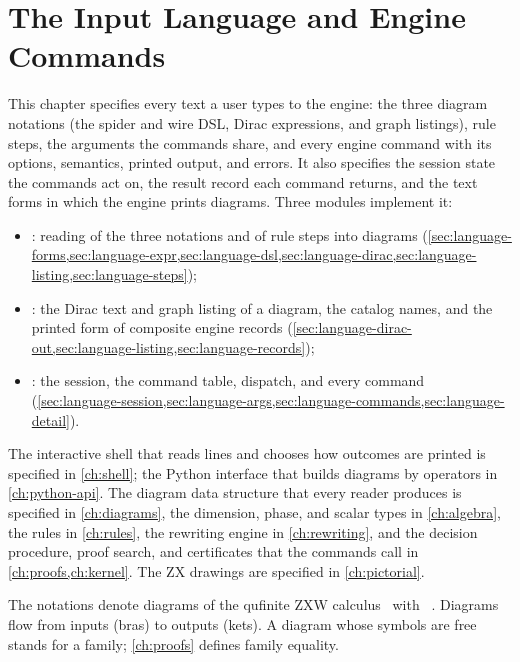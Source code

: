 \chapter{The Input Language and Engine Commands}\label{ch:language}

This chapter specifies every text a user types to the engine: the three diagram notations (the spider and wire DSL, Dirac expressions, and graph listings), rule steps, the arguments the commands share, and every engine command with its options, semantics, printed output, and errors. It also specifies the session state the commands act on, the result record each command returns, and the text forms in which the engine prints diagrams. Three modules implement it:
\begin{itemize}
\item {}: reading of the three notations and of rule steps into diagrams (\cref{sec:language-forms,sec:language-expr,sec:language-dsl,sec:language-dirac,sec:language-listing,sec:language-steps});
\item {}: the Dirac text and graph listing of a diagram, the catalog names, and the printed form of composite engine records (\cref{sec:language-dirac-out,sec:language-listing,sec:language-records});
\item {}: the session, the command table, dispatch, and every command (\cref{sec:language-session,sec:language-args,sec:language-commands,sec:language-detail}).
\end{itemize}
The interactive shell that reads lines and chooses how outcomes are printed is specified in \cref{ch:shell}; the Python interface that builds diagrams by operators in \cref{ch:python-api}. The diagram data structure that every reader produces is specified in \cref{ch:diagrams}, the dimension, phase, and scalar types in \cref{ch:algebra}, the rules in \cref{ch:rules}, the rewriting engine in \cref{ch:rewriting}, and the decision procedure, proof search, and certificates that the commands call in \cref{ch:proofs,ch:kernel}. The ZX drawings are specified in \cref{ch:pictorial}.

The notations denote diagrams of the qufinite ZXW calculus~\cite{coecke2011interacting,poor2023zxw,wang2023qufinitezxw} with \bboxes{}~\cite{dixon2009graphical,kissinger2014pattern}. Diagrams flow from inputs (bras) to outputs (kets). A diagram whose symbols are free stands for a family; \cref{ch:proofs} defines family equality.

